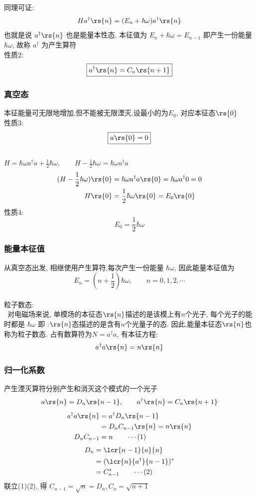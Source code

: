 \begin{frame}
同理可证: 
\[  H a^\dagger \rs{n}  =  (E_n +  \hbar \omega ) a^\dagger \rs{n} \]
也就是说 $a^\dagger\rs{n} $ 也是能量本性态, 本征值为 $E_n + \hbar \omega = E_{n-1} $ 即产生一份能量$ \hbar \omega $, 故称 $a^\dagger$ 为产生算符\\ 
性质2: 
\[ \boxed{a^\dagger \rs{n}= C_n \rs{n+1}} \]

\end{frame}

\begin{frame}
    \frametitle{真空态}
    本征能量可无限地增加,但不能被无限湮灭,设最小的为$E_0$, 对应本征态$\rs{0}$\\ 
    性质3:
    \[ \boxed{a \rs{0}= 0 }\]
    ~~\\ 
    $H=\hbar \omega a ^\dagger a + \frac{1}{2}\hbar \omega, \qquad H-\frac{1}{2}\hbar \omega=\hbar \omega a ^\dagger a $ 
    \[ 
  \begin{aligned}
    (H-\frac{1}{2}\hbar \omega) \rs{0} &= \hbar \omega a ^\dagger a \rs{0} = \hbar \omega a ^\dagger 0 = 0 \\ 
    H \rs{0} &= \frac{1}{2}\hbar \omega \rs{0}=E_0 \rs{0} 
  \end{aligned}
  \] 
  性质4:  \[ \boxed{E_0=\dfrac{1}{2}\hbar \omega} \]
\end{frame}

\begin{frame}
    \frametitle{能量本征值}
     从真空态出发, 相继使用产生算符,每次产生一份能量 $ \hbar \omega$, 因此能量本征值为
     \[E_n = (n+\frac{1}{2})\hbar \omega, \qquad n=0,1,2, \cdots  \] 
  ~~\\
    粒子数态:\\
     对电磁场来说, 单模场的本征态$\rs{n}$描述的是该模上有$n$个光子, 每个光子的能时都是 $\hbar \omega$ 即 :$\rs{n}$态描述的是含有$n$个光量子的态. 因此,能量本征态$\rs{n}$也称为粒子数态. 占有数算符为$ N=a^\dagger a $, 有本征方程:
    \[ a^\dagger a \rs{n}= n\rs{n}\] 
\end{frame}

\begin{frame}
  \frametitle{归一化系数}
  产生湮灭算符分别产生和消灭这个模式的一个光子
  \[ {a \rs{n}= D_n\rs{n-1}}, \qquad a^\dagger \rs{n}= C_n \rs{n+1} \]  
  \[ 
    \begin{aligned}
      a^\dagger a \rs{n} &= a^\dagger D_n\rs{n-1} \\ 
      &= D_n C_{n-1} \rs{n} = n \rs{n} \\ 
      D_n C_{n-1}&=n \qquad \cdots (1)
    \end{aligned}
    \] 
    \[ 
      \begin{aligned}
        D_n &=  \lcr{n-1}{a}{n} \\
        &=  (\lcr{n}{a^\dagger }{n-1})^* \\
        &= C_{n-1} ^*   \qquad \cdots (2)
      \end{aligned}
      \] 
      联立(1)(2), 得 $C_{n-1}=\sqrt{n}= D_n, C_{n}=\sqrt{n+1} $
\end{frame}


